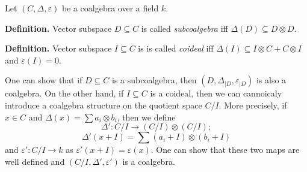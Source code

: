 \documentclass[12pt]{article}
\begin{document}
Let $(C,\Delta,\varepsilon)$ be a coalgebra over a field $k$.

\textbf{Definition.} Vector subspace $D\subseteq C$ is called \textit{subcoalgebra} iff $\Delta(D)\subseteq D\otimes D$.

\textbf{Definition.} Vector subspace $I\subseteq C$ is is called \textit{coideal} iff $\Delta(I)\subseteq I\otimes C + C\otimes I$ and $\varepsilon(I)=0$.

One can show that if $D\subseteq C$ is a subcoalgebra, then $(D, \Delta_{| D}, \varepsilon_{| D})$ is also a coalgebra. On the other hand, if $I\subseteq C$ is a coideal, then we can cannoicaly introduce a coalgebra structure on the quotient space $C/I$. More precisely, if $x\in C$ and $\Delta(x)=\sum a_i\otimes b_i$, then we define
$$\Delta':C/I\to (C/I)\otimes (C/I);$$
$$\Delta'(x+I)=\sum (a_i+I)\otimes (b_i+I)$$
and $\varepsilon':C/I\to k$ as $\varepsilon'(x+I)=\varepsilon(x)$. One can show that these two maps are well defined and $(C/I,\Delta',\varepsilon')$ is a coalgebra.
\end{document}
